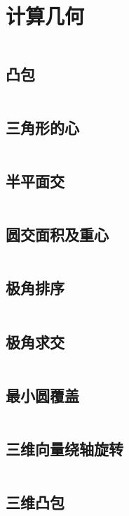 \chapter{计算几何}

\inputminted{cpp}{\source/computational-geometry/2d/basis.cpp}
\section{凸包}
\inputminted{cpp}{\source/computational-geometry/2d/convex.cpp}
\section{三角形的心}
\inputminted{cpp}{\source/computational-geometry/2d/triangle.cpp}
\section{半平面交}
\inputminted{cpp}{\source/computational-geometry/2d/half-plane-intersection.cpp}
\section{圆交面积及重心}
\inputminted{cpp}{\source/computational-geometry/2d/circles-intersections.cpp}
\section{极角排序}
\inputminted{cpp}{\source/computational-geometry/2d/angle_sort.cpp}
\section{极角求交}
\inputminted{cpp}{\source/computational-geometry/2d/angle_intersect.cpp}
\section{最小圆覆盖}
\inputminted{cpp}{\source/computational-geometry/2d/circle_mincover.cpp}

\section{三维向量绕轴旋转}
\inputminted{cpp}{\source/computational-geometry/3d/basis.cpp}
\section{三维凸包}
\inputminted{cpp}{\source/computational-geometry/3d/convex.cpp}
